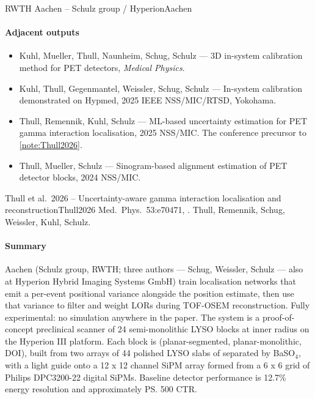 \begin{programnote}{RWTH Aachen -- Schulz group / Hyperion}{Aachen}
\paragraph{Adjacent outputs}
\begin{itemize}
	\item Kuhl, Mueller, Thull, Naunheim, Schug, Schulz --- 3D in-system
		calibration method for PET detectors, \emph{Medical Physics}.
	\item Kuhl, Thull, Gegenmantel, Weissler, Schug, Schulz --- In-system
		calibration demonstrated on Hypmed, 2025 IEEE NSS/MIC/RTSD, Yokohama.
	\item Thull, Remennik, Kuhl, Schulz --- ML-based uncertainty estimation for
		PET gamma interaction localisation, 2025 NSS/MIC. The conference
		precursor to \ref{note:Thull2026}.
	\item Thull, Mueller, Schulz --- Sinogram-based alignment estimation of PET
		detector blocks, 2024 NSS/MIC.
\end{itemize}
 
\begin{papernote}{Thull et al.\ 2026 -- Uncertainty-aware gamma interaction localisation and reconstruction}{Thull2026}
Med.\ Phys.\ 53:e70471, . Thull, Remennik, Schug, Weissler,
Kuhl, Schulz.

\paragraph{Summary}
Aachen (Schulz group, RWTH; three authors --- Schug, Weissler, Schulz --- also at Hyperion Hybrid Imaging Systems GmbH)
train localisation networks that emit a per-event positional variance alongside the
position estimate, then use that variance to filter and weight LORs during TOF-OSEM
reconstruction. Fully experimental: no simulation anywhere in the paper. The system is a
proof-of-concept preclinical scanner of 24 semi-monolithic LYSO blocks at  inner
radius on the Hyperion III platform. Each block is
 (planar-segmented,
planar-monolithic, DOI), built from two arrays of 44 polished LYSO slabs of
 separated by  BaSO$_4$, with a 
light guide onto a 12 x 12
channel SiPM array formed from a 6 x 6 grid of Philips DPC3200-22 digital SiPMs.
Baseline detector performance is 12.7\% energy resolution and approximately \ps{500} CTR.


\end{papernote}
\end{programnote}
